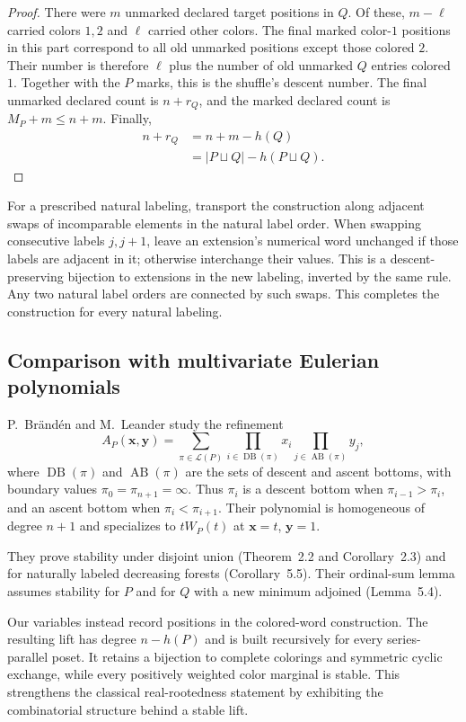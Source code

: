 \begin{proof}
There were $m$ unmarked declared target positions in $Q$. Of these,
$m-\ell$ carried colors $1,2$ and $\ell$ carried other colors.
The final marked color-$1$ positions in this part correspond to all old
unmarked positions except those colored $2$. Their number is therefore
$\ell$ plus the number of old unmarked $Q$ entries colored $1$.
Together with the $P$ marks, this is the shuffle's descent number.
The final unmarked declared count is $n+r_Q$, and the marked declared
count is $M_P+m\leq n+m$. Finally,
\[
 \begin{aligned}
 n+r_Q&=n+m-h(Q)\\
 &=|P\sqcup Q|-h(P\sqcup Q).
 \end{aligned}
\]
\end{proof}

For a prescribed natural labeling, transport the construction along adjacent
swaps of incomparable elements in the natural label order. When swapping
consecutive labels $j,j+1$, leave an extension's numerical word unchanged
if those labels are adjacent in it; otherwise interchange their values.
This is a descent-preserving bijection to extensions in the new labeling,
inverted by the same rule. Any two natural label orders are connected by
such swaps. This completes the construction for every natural labeling.

\subsection[stableLiftComparison]{Comparison with multivariate Eulerian polynomials}

P.~Br\"and\'en and M.~Leander \cite{BrandenLeander2016x} study the
refinement
\[
 A_P(\mathbf x,\mathbf y)
 =\sum_{\pi\in\mathcal L(P)}
 \prod_{i\in\operatorname{DB}(\pi)}x_i
 \prod_{j\in\operatorname{AB}(\pi)}y_j,
\]
where $\operatorname{DB}(\pi)$ and $\operatorname{AB}(\pi)$ are the sets
of descent and ascent bottoms, with boundary values
$\pi_0=\pi_{n+1}=\infty$. Thus $\pi_i$ is a descent bottom when
$\pi_{i-1}>\pi_i$, and an ascent bottom when $\pi_i<\pi_{i+1}$.
Their polynomial is homogeneous of degree $n+1$ and specializes to
$tW_P(t)$ at $\mathbf x=t$, $\mathbf y=1$.

They prove stability under disjoint union (Theorem~2.2 and Corollary~2.3)
and for naturally labeled decreasing forests (Corollary~5.5). Their
ordinal-sum lemma assumes stability for $P$ and for $Q$ with a new minimum
adjoined (Lemma~5.4).

Our variables instead record positions in the colored-word construction.
The resulting lift has degree $n-h(P)$ and is built recursively for every
series-parallel poset. It retains a bijection to complete colorings and
symmetric cyclic exchange, while every positively weighted color marginal
is stable. This strengthens the classical real-rootedness statement by
exhibiting the combinatorial structure behind a stable lift.
